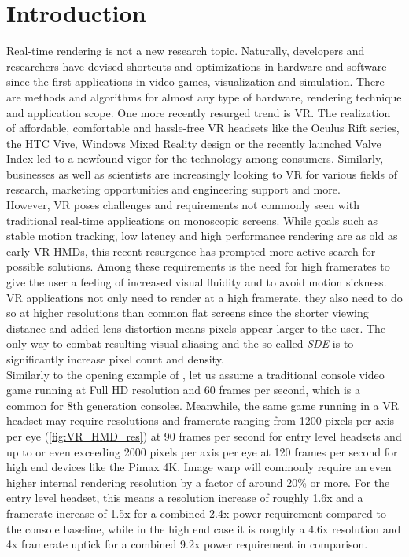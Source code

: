 
\chapter{Introduction}
Real-time rendering is not a new research topic. Naturally,  developers and researchers have devised shortcuts and optimizations in hardware and software since the first applications in video games, visualization and simulation. There are methods and algorithms for almost any type of hardware, rendering technique and application scope. 
One more recently resurged trend is \gls{VR}. The realization of  affordable, comfortable and hassle-free \gls{VR} headsets like the Oculus Rift series, the HTC Vive, Windows Mixed Reality design or the recently launched Valve Index led to a newfound vigor for the technology among consumers. Similarly, businesses as well as scientists are increasingly looking to \gls{VR} for various fields of research, marketing opportunities and engineering support and more. \\
However, \gls{VR} poses challenges and requirements not commonly seen with traditional real-time applications on monoscopic screens.  While goals such as stable motion tracking, low latency and high performance rendering are as old as early \gls{VR} \glspl{HMD}, this recent resurgence has prompted more active search for possible solutions. Among these requirements is the need for high framerates to give the user a feeling of increased visual fluidity and to avoid motion sickness. \gls{VR} applications not only need to render at a high framerate, they also need to do so at higher resolutions than common flat screens since the shorter viewing distance and added lens distortion means pixels appear larger to the user. The only way to combat resulting visual aliasing and the so called \textit{\gls{SDE}} is to significantly increase pixel count and density. \\

Similarly to the opening example of \cite{InigoQuilez.2017}, let us assume a traditional console video game running at Full HD resolution and 60 frames per second, which is a common for 8th generation consoles. Meanwhile, the same game running in a VR headset may require resolutions and framerate ranging from 1200 pixels per axis per eye (\autoref{fig:VR_HMD_res}) at 90 frames per second for entry level headsets and up to or even exceeding 2000 pixels per axis per eye at 120 frames per second for high end devices like the Pimax 4K. Image warp will commonly require an even higher internal rendering resolution by a factor of around 20\% or more. For the entry level headset, this means a resolution increase of roughly 1.6x and a framerate increase of 1.5x for a combined 2.4x power requirement compared to the console baseline, while in the high end case it is roughly a 4.6x resolution and 4x framerate uptick for a combined 9.2x power requirement in comparison. \\

